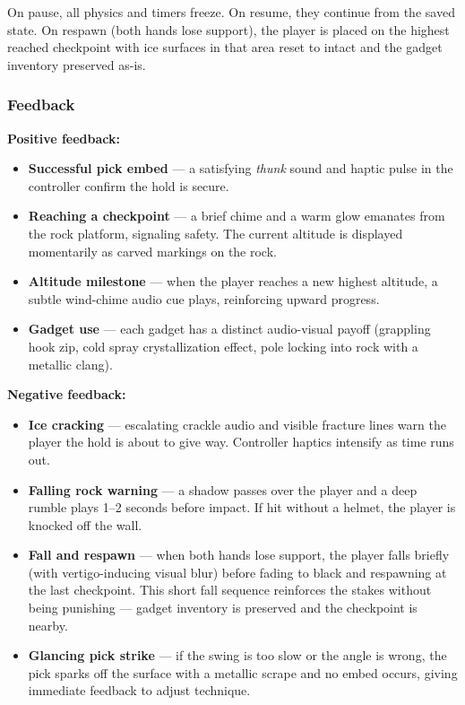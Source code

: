 \documentclass[12pt]{article}
\begin{document}
On pause, all physics and timers freeze. On resume, they continue from the saved state. On respawn (both hands lose support), the player is placed on the highest reached checkpoint with ice surfaces in that area reset to intact and the gadget inventory preserved as-is.

\subsubsection{Feedback}

\textbf{Positive feedback:}
\begin{itemize}[leftmargin=2em]
    \item \textbf{Successful pick embed} --- a satisfying \emph{thunk} sound and haptic pulse in the controller confirm the hold is secure.
    \item \textbf{Reaching a checkpoint} --- a brief chime and a warm glow emanates from the rock platform, signaling safety. The current altitude is displayed momentarily as carved markings on the rock.
    \item \textbf{Altitude milestone} --- when the player reaches a new highest altitude, a subtle wind-chime audio cue plays, reinforcing upward progress.
    \item \textbf{Gadget use} --- each gadget has a distinct audio-visual payoff (grappling hook zip, cold spray crystallization effect, pole locking into rock with a metallic clang).
\end{itemize}

\textbf{Negative feedback:}
\begin{itemize}[leftmargin=2em]
    \item \textbf{Ice cracking} --- escalating crackle audio and visible fracture lines warn the player the hold is about to give way. Controller haptics intensify as time runs out.
    \item \textbf{Falling rock warning} --- a shadow passes over the player and a deep rumble plays 1--2 seconds before impact. If hit without a helmet, the player is knocked off the wall.
    \item \textbf{Fall and respawn} --- when both hands lose support, the player falls briefly (with vertigo-inducing visual blur) before fading to black and respawning at the last checkpoint. This short fall sequence reinforces the stakes without being punishing --- gadget inventory is preserved and the checkpoint is nearby.
    \item \textbf{Glancing pick strike} --- if the swing is too slow or the angle is wrong, the pick sparks off the surface with a metallic scrape and no embed occurs, giving immediate feedback to adjust technique.
\end{itemize}
\end{document}
